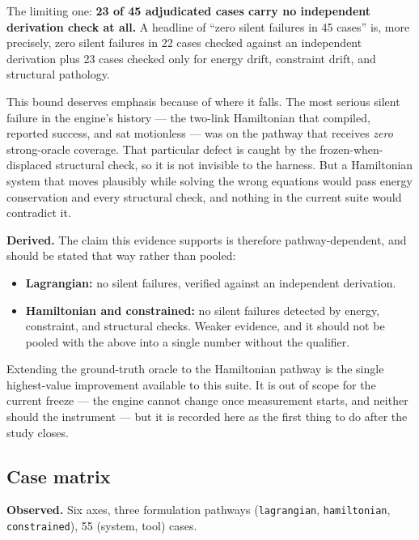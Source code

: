 \documentclass[11pt,a4paper]{article}
\begin{document}
The limiting one: \textbf{23 of 45 adjudicated cases carry no independent
derivation check at all.} A headline of ``zero silent failures in 45 cases''
is, more precisely, zero silent failures in 22 cases checked against an
independent derivation plus 23 cases checked only for energy drift, constraint
drift, and structural pathology.

This bound deserves emphasis because of where it falls. The most serious silent
failure in the engine's history --- the two-link Hamiltonian that compiled,
reported success, and sat motionless --- was on the pathway that receives
\emph{zero} strong-oracle coverage. That particular defect is caught by the
frozen-when-displaced structural check, so it is not invisible to the harness.
But a Hamiltonian system that moves plausibly while solving the wrong equations
would pass energy conservation and every structural check, and nothing in the
current suite would contradict it.

\noindent\textbf{Derived.} The claim this evidence supports is therefore
pathway-dependent, and should be stated that way rather than pooled:

\begin{itemize}[leftmargin=1.4em,itemsep=0.25em]
  \item \textbf{Lagrangian:} no silent failures, verified against an
        independent derivation.
  \item \textbf{Hamiltonian and constrained:} no silent failures detected by
        energy, constraint, and structural checks. Weaker evidence, and it
        should not be pooled with the above into a single number without the
        qualifier.
\end{itemize}

\noindent Extending the ground-truth oracle to the Hamiltonian pathway is the
single highest-value improvement available to this suite. It is out of scope
for the current freeze --- the engine cannot change once measurement starts,
and neither should the instrument --- but it is recorded here as the first
thing to do after the study closes.

\subsection{Case matrix}

\noindent\textbf{Observed.} Six axes, three formulation pathways
(\texttt{lagrangian}, \texttt{hamiltonian}, \texttt{constrained}), 55
(system, tool) cases.
\end{document}
